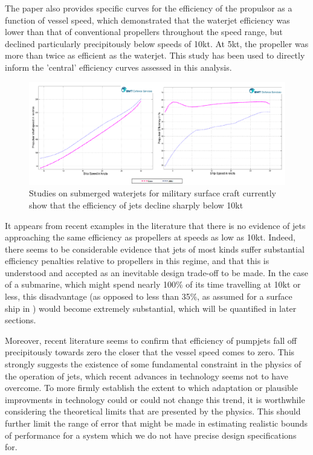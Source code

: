 \documentclass{article}\usepackage[]{graphicx}\usepackage[]{color}
\begin{document}
The paper also provides specific curves for the efficiency of the propulsor as a function of vessel speed, which demonstrated that the waterjet efficiency was lower than that of conventional propellers throughout the speed range, but declined particularly precipitously below speeds of 10kt.  At 5kt, the propeller was more than twice as efficient as the waterjet.  This study has been used to directly inform the 'central' efficiency curves assessed in this analysis.

\begin{figure}
\includegraphics[width=\textwidth]{BMTEfficiency.png}
\caption{Studies on submerged waterjets for military surface craft currently show that the efficiency of jets decline sharply below 10kt \parencite{giles2010}}
\label{fig:BMTEfficiency.png}
\end{figure}

It appears from recent examples in the literature that there is no evidence of jets approaching the same efficiency as propellers at speeds as low as 10kt.  Indeed, there seems to be considerable evidence that jets of most kinds suffer substantial efficiency penalties relative to propellers in this regime, and that this is understood and accepted as an inevitable design trade-off to be made.  In the case of a submarine, which might spend nearly 100\% of its time travelling at 10kt or less, this disadvantage (as opposed to less than 35\%, as assumed for a surface ship in \cite{giles2010}) would become extremely substantial, which will be quantified in later sections.

Moreover, recent literature seems to confirm that efficiency of pumpjets fall off precipitously towards zero the closer that the vessel speed comes to zero.  This strongly suggests the existence of some fundamental constraint in the physics of the operation of jets, which recent advances in technology seems not to have overcome.  To more firmly establish the extent to which adaptation or plausible improvments in technology could or could not change this trend, it is worthwhile considering the theoretical limits that are presented by the physics.  This should further limit the range of error that might be made in estimating realistic bounds of performance for a system which we do not have precise design specifications for.
\end{document}

